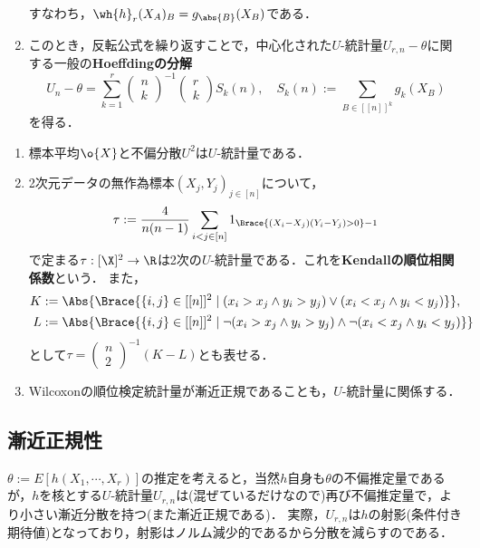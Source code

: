 \documentclass[uplatex,dvipdfmx]{jsreport}
\begin{document}
\begin{model}[$U$-統計量が構成可能な模型]
\begin{enumerate}
        すなわち，$\wh{h}_r(X_A)_B=g_{\abs{B}}(X_B)$である．
        \item このとき，反転公式を繰り返すことで，中心化された$U$-統計量$U_{r,n}-\theta$に関する一般の\textbf{Hoeffdingの分解}
        \[U_n-\theta=\sum_{k=1}^r \begin{pmatrix}n\\k\end{pmatrix}^{-1}\begin{pmatrix}r\\k\end{pmatrix}S_k(n),\quad S_k(n):=\sum_{B\in[[n]]^k}g_k(X_B)\]
        を得る．
    \end{enumerate}
\end{model}

\begin{example}\mbox{}
    \begin{enumerate}
        \item 標本平均$\o{X}$と不偏分散$U^2$は$U$-統計量である．
        \item 2次元データの無作為標本$(X_j,Y_j)_{j\in[n]}$について，
        \[\tau:=\frac{4}{n(n-1)}\sum_{i<j\in[n]}1_{\Brace{(X_i-X_j)(Y_i-Y_j)>0}-1}\]
        で定まる$\tau:[\X]^2\to\R$は2次の$U$-統計量である．これを\textbf{Kendallの順位相関係数}という．
        また，
        \begin{align*}
            K&:=\Abs{\Brace{\{i,j\}\in[[n]]^2\mid (x_i>x_j\land y_i>y_j)\lor(x_i<x_j\land y_i<y_j)}},\\L&:=\Abs{\Brace{\{i,j\}\in[[n]]^2\mid\lnot(x_i>x_j\land y_i>y_j)\land\lnot(x_i<x_j\land y_i<y_j)}}
        \end{align*}
        として$\tau=\begin{pmatrix}n\\2\end{pmatrix}^{-1}(K-L)$とも表せる．
        \item Wilcoxonの順位検定統計量が漸近正規であることも，$U$-統計量に関係する．
    \end{enumerate}
\end{example}

\subsection{漸近正規性}

\begin{tcolorbox}[colframe=ForestGreen, colback=ForestGreen!10!white,breakable,colbacktitle=ForestGreen!40!white,coltitle=black,fonttitle=\bfseries\sffamily,
title=]
$\theta:=E[h(X_1,\cdots,X_r)]$の推定を考えると，当然$h$自身も$\theta$の不偏推定量であるが，$h$を核とする$U$-統計量$U_{r,n}$は(混ぜているだけなので)再び不偏推定量で，より小さい漸近分散を持つ(また漸近正規である)．
実際，$U_{r,n}$は$h$の射影(条件付き期待値)となっており，射影はノルム減少的であるから分散を減らすのである．
\end{tcolorbox}
\end{document}
